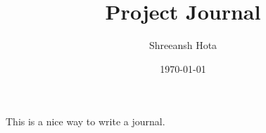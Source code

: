 \documentclass{article}
\title{Project Journal}
\author{Shreeansh Hota}
\date{\today}
\begin{document}
\maketitle

This is a nice way to write a journal.
\end{document}
